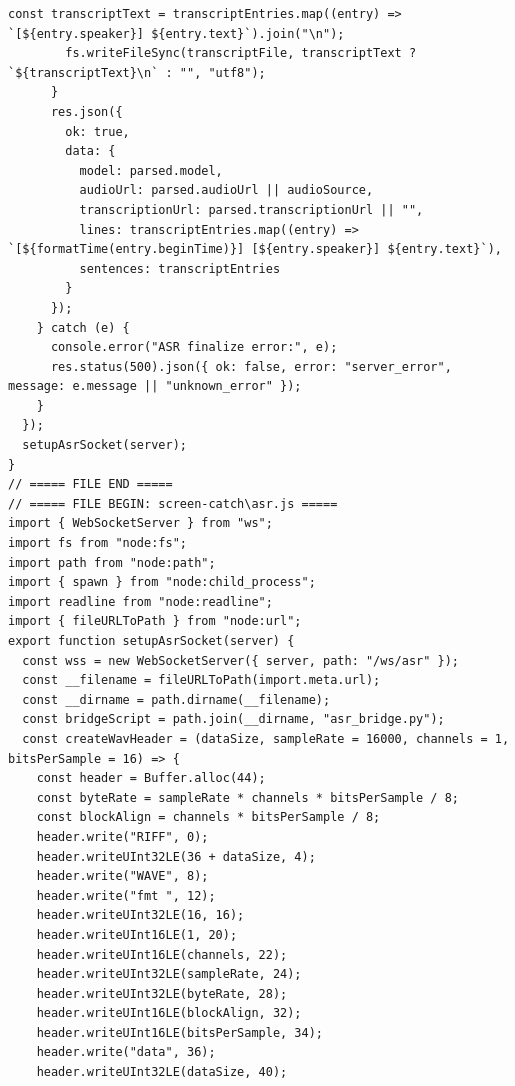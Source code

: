 \documentclass[12pt,a4paper]{article}
\begin{document}
\begin{Verbatim}[fontsize=\footnotesize]
        const transcriptText = transcriptEntries.map((entry) => `[${entry.speaker}] ${entry.text}`).join("\n");
        fs.writeFileSync(transcriptFile, transcriptText ? `${transcriptText}\n` : "", "utf8");
      }
      res.json({
        ok: true,
        data: {
          model: parsed.model,
          audioUrl: parsed.audioUrl || audioSource,
          transcriptionUrl: parsed.transcriptionUrl || "",
          lines: transcriptEntries.map((entry) => `[${formatTime(entry.beginTime)}] [${entry.speaker}] ${entry.text}`),
          sentences: transcriptEntries
        }
      });
    } catch (e) {
      console.error("ASR finalize error:", e);
      res.status(500).json({ ok: false, error: "server_error", message: e.message || "unknown_error" });
    }
  });
  setupAsrSocket(server);
}
// ===== FILE END =====
// ===== FILE BEGIN: screen-catch\asr.js =====
import { WebSocketServer } from "ws";
import fs from "node:fs";
import path from "node:path";
import { spawn } from "node:child_process";
import readline from "node:readline";
import { fileURLToPath } from "node:url";
export function setupAsrSocket(server) {
  const wss = new WebSocketServer({ server, path: "/ws/asr" });
  const __filename = fileURLToPath(import.meta.url);
  const __dirname = path.dirname(__filename);
  const bridgeScript = path.join(__dirname, "asr_bridge.py");
  const createWavHeader = (dataSize, sampleRate = 16000, channels = 1, bitsPerSample = 16) => {
    const header = Buffer.alloc(44);
    const byteRate = sampleRate * channels * bitsPerSample / 8;
    const blockAlign = channels * bitsPerSample / 8;
    header.write("RIFF", 0);
    header.writeUInt32LE(36 + dataSize, 4);
    header.write("WAVE", 8);
    header.write("fmt ", 12);
    header.writeUInt32LE(16, 16);
    header.writeUInt16LE(1, 20);
    header.writeUInt16LE(channels, 22);
    header.writeUInt32LE(sampleRate, 24);
    header.writeUInt32LE(byteRate, 28);
    header.writeUInt16LE(blockAlign, 32);
    header.writeUInt16LE(bitsPerSample, 34);
    header.write("data", 36);
    header.writeUInt32LE(dataSize, 40);
\end{Verbatim}
\newpage
{}
\fancyhead[R]{}
\end{document}
